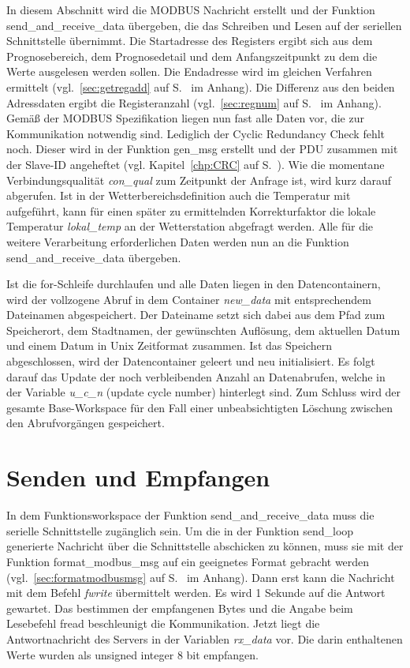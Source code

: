
In diesem Abschnitt wird die MODBUS Nachricht erstellt und der Funktion \textsf{send\_and\_receive\_data} übergeben, die das Schreiben und Lesen auf der seriellen Schnittstelle übernimmt. Die Startadresse des Registers ergibt sich aus dem Prognosebereich, dem Prognosedetail und dem Anfangszeitpunkt zu dem die Werte ausgelesen werden sollen. Die Endadresse wird im gleichen Verfahren ermittelt (vgl.~\ref{sec:getregadd} auf S.~\pageref{sec:getregadd} im Anhang). Die Differenz aus den beiden Adressdaten ergibt die Registeranzahl (vgl.~\ref{sec:regnum} auf S.~\pageref{sec:regnum} im Anhang). Gemäß der MODBUS Spezifikation liegen nun fast alle Daten vor, die zur Kommunikation notwendig sind. Lediglich der Cyclic Redundancy Check fehlt noch. Dieser wird in der Funktion \textsf{gen\_msg} erstellt und der PDU zusammen mit der Slave-ID angeheftet (vgl. Kapitel~\ref{chp:CRC} auf S.~\pageref{chp:CRC}). Wie die momentane Verbindungsqualität \textit{con\_qual} zum Zeitpunkt der Anfrage ist, wird kurz darauf abgerufen. Ist in der Wetterbereichsdefinition auch die Temperatur mit aufgeführt, kann für einen später zu ermittelnden Korrekturfaktor die lokale Temperatur \textit{lokal\_temp} an der Wetterstation abgefragt werden. Alle für die weitere Verarbeitung erforderlichen Daten werden nun an die Funktion \textsf{send\_and\_receive\_data} übergeben. 

Ist die for-Schleife durchlaufen und alle Daten liegen in den Datencontainern, wird der vollzogene Abruf in dem Container \textit{new\_data} mit entsprechendem Dateinamen abgespeichert. Der Dateiname setzt sich dabei aus dem Pfad zum Speicherort, dem Stadtnamen, der gewünschten Auflösung, dem aktuellen Datum und einem Datum in Unix Zeitformat zusammen. Ist das Speichern abgeschlossen, wird der Datencontainer geleert und neu initialisiert. Es folgt darauf das Update der noch verbleibenden Anzahl an Datenabrufen, welche in der Variable \textit{u\_c\_n} (update cycle number) hinterlegt sind. Zum Schluss wird der gesamte Base-Workspace für den Fall einer unbeabsichtigten Löschung zwischen den Abrufvorgängen gespeichert. 

\section{Senden und Empfangen}
In dem Funktionsworkspace der Funktion \textsf{send\_and\_receive\_data} muss die serielle Schnittstelle zugänglich sein. Um die in der Funktion \textsf{send\_loop} generierte Nachricht über die Schnittstelle abschicken zu können, muss sie mit der Funktion \textsf{format\_modbus\_msg} auf ein geeignetes Format gebracht werden (vgl.~\ref{sec:formatmodbusmsg} auf S.~\pageref{sec:formatmodbusmsg} im Anhang). Dann erst kann die Nachricht mit dem Befehl \textit{fwrite} übermittelt werden. Es wird 1 Sekunde auf die Antwort gewartet. Das bestimmen der empfangenen Bytes und die Angabe beim Lesebefehl \textsf{fread} beschleunigt die Kommunikation. Jetzt liegt die Antwortnachricht des Servers in der Variablen \textit{rx\_data} vor. Die darin enthaltenen Werte wurden als unsigned integer 8 bit empfangen.

